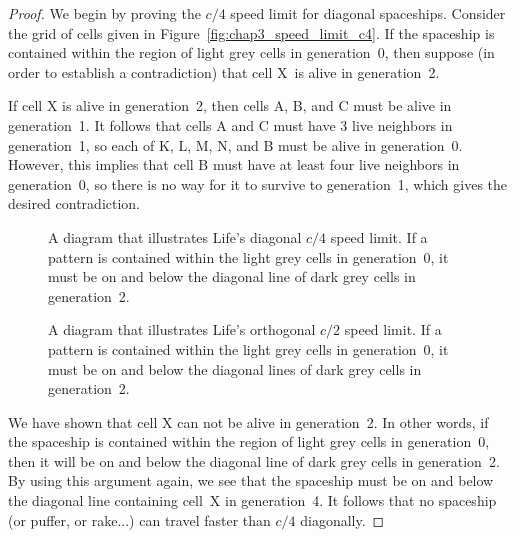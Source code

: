 \begin{proof}
	We begin by proving the $c/4$ speed limit for diagonal spaceships. Consider the grid of cells given in Figure~\ref{fig:chap3_speed_limit_c4}. If the spaceship is contained within the region of light grey cells in generation~0, then suppose (in order to establish a contradiction) that cell X~is alive in generation~2.
	
	If cell X is alive in generation~2, then cells A, B, and C must be alive in generation~1. It follows that cells A and C must have 3 live neighbors in generation~1, so each of K, L, M, N, and B must be alive in generation~0. However, this implies that cell B must have at least four live neighbors in generation~0, so there is no way for it to survive to generation~1, which gives the desired contradiction.
	
	\begin{figure}[!htb]
		\centering
		\begin{minipage}{.47\textwidth}
			\centering{}
			
			\caption{A diagram that illustrates Life's diagonal $c/4$ speed limit. If a pattern is contained within the light grey cells in generation~0, it must be on and below the diagonal line of dark grey cells in generation~2.}\label{fig:chap3_speed_limit_c4}
		\end{minipage} \quad %
		\begin{minipage}{.48\textwidth}
			\centering{}
			\caption{A diagram that illustrates Life's orthogonal $c/2$ speed limit. If a pattern is contained within the light grey cells in generation~0, it must be on and below the diagonal lines of dark grey cells in generation~2.}\label{fig:chap3_speed_limit_c2}
		\end{minipage}
	\end{figure}
	
	We have shown that cell X can not be alive in generation~2. In other words, if the spaceship is contained within the region of light grey cells in generation~0, then it will be on and below the diagonal line of dark grey cells in generation~2. By using this argument again, we see that the spaceship must be on and below the diagonal line containing cell~X in generation~4. It follows that no spaceship (or puffer, or rake...) can travel faster than $c/4$ diagonally.
	

\end{proof}
